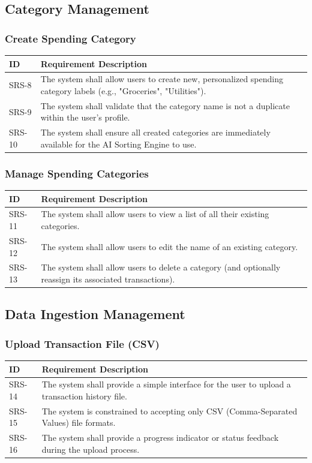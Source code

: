 \documentclass[11pt,a4paper]{report}
\begin{document}
\subsection{Category Management}

\subsubsection{Create Spending Category}
\begin{longtable}{|p{2.5cm}|p{12cm}|}
	\hline
	\textbf{ID} & \textbf{Requirement Description} \\
	\hline
	SRS-8 & The system shall allow users to create new, personalized spending category labels (e.g., "Groceries", "Utilities"). \\ \hline
	SRS-9 & The system shall validate that the category name is not a duplicate within the user's profile. \\ \hline
	SRS-10 & The system shall ensure all created categories are immediately available for the AI Sorting Engine to use. \\ \hline
\end{longtable}

\subsubsection{Manage Spending Categories}
\begin{longtable}{|p{2.5cm}|p{12cm}|}
	\hline
	\textbf{ID} & \textbf{Requirement Description} \\
	\hline
	SRS-11 & The system shall allow users to view a list of all their existing categories. \\ \hline
	SRS-12 & The system shall allow users to edit the name of an existing category. \\ \hline
	SRS-13 & The system shall allow users to delete a category (and optionally reassign its associated transactions). \\ \hline
\end{longtable}

\subsection{Data Ingestion Management}

\subsubsection{Upload Transaction File (CSV)}
\begin{longtable}{|p{2.5cm}|p{12cm}|}
	\hline
	\textbf{ID} & \textbf{Requirement Description} \\
	\hline
	SRS-14 & The system shall provide a simple interface for the user to upload a transaction history file. \\ \hline
	SRS-15 & The system is constrained to accepting only CSV (Comma-Separated Values) file formats. \\ \hline
	SRS-16 & The system shall provide a progress indicator or status feedback during the upload process. \\ \hline
\end{longtable}
\end{document}

